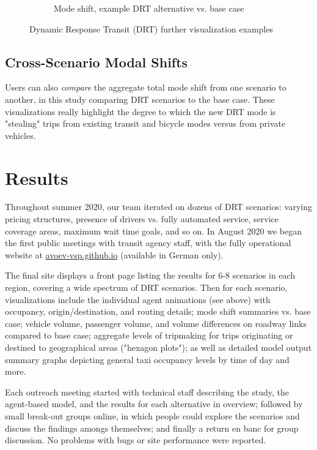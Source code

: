 \documentclass[3p,times,procedia]{elsarticle}
\begin{document}
\begin{figure}[ht]
\begin{subfigure}[c]{0.32\textwidth}
     \caption{Mode shift, example DRT alternative vs. base case}
     \label{fig:flyover}
  \end{subfigure}
  \caption{Dynamic Response Transit (DRT) further visualization examples}
\end{figure}

\subsection{Cross-Scenario Modal Shifts}

Users can also \emph{compare} the aggregate total mode shift from one scenario to another, in this study comparing DRT scenarios to the base case. These visualizations really highlight the degree to which the new DRT mode is "stealing" trips from existing transit and bicycle modes versus from private vehicles.


\section{Results}
\label{results}

Throughout summer 2020, our team iterated on dozens of DRT scenarios: varying pricing structures, presence of drivers vs. fully automated service, service coverage areas, maximum wait time goals, and so on. In August 2020 we began the first public meetings with transit agency staff, with the fully operational website at \href{https://avoev-vsp.github.io}{avoev-vsp.github.io} (available in German only).

The final site displays a front page listing the results for 6-8 scenarios in each region, covering a wide spectrum of DRT scenarios. Then for each scenario, visualizations include the individual agent animations (see above) with occupancy, origin/destination, and routing details; mode shift summaries vs. base case; vehicle volume, passenger volume, and volume differences on roadway links compared to base case; aggregate levels of tripmaking for trips originating or destined to geographical areas ("hexagon plots"); as well as detailed model output summary graphs depicting general taxi occupancy levels by time of day and more.

Each outreach meeting started with technical staff describing the study, the agent-based model, and the results for each alternative in overview; followed by small break-out groups online, in which people could explore the scenarios and discuss the findings amongs themselves; and finally a return en banc for group discussion. No problems with bugs or site performance were reported.
\end{document}
